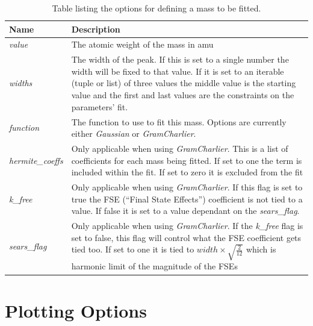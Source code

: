 \documentclass[paper=a4, fontsize=11pt]{scrartcl}	%
\numberwithin{equation}{section}															%
\numberwithin{figure}{section}																%
\numberwithin{table}{section}
\begin{document}
\begin{appendices}
\begin{table}[H]
\centering
\begin{tabular}{ l p{12cm}}
Name & Description \\ \hline
\textit{value} & The atomic weight of the mass in amu \\ \hline
\textit{widths} & The width of the peak. If this is set to a single number the width will be fixed to that value. If it is set to an iterable (tuple or list) of three values the middle value is the starting value and the first and last values are the constraints on the parameters' fit. \\ \hline
\textit{function} & The function to use to fit this mass. Options are currently either \textit{Gaussian} or \textit{GramCharlier}. \\ \hline
\textit{hermite\_coeffs} & Only applicable when using \textit{GramCharlier}. This is a list of coefficients for each mass being fitted. If set to one the term is included within the fit. If set to zero it is excluded from the fit\\ \hline
\textit{k\_free} & Only applicable when using \textit{GramCharlier}. If this flag is set to true the FSE (``Final State Effects'') coefficient is not tied to a value. If false it is set to a value dependant on the \textit{sears\_flag}.\\ \hline
\textit{sears\_flag} & Only applicable when using \textit{GramCharlier}. If the \textit{k\_free} flag is set to false, this flag will control what the FSE coefficient gets tied too. If set to one it is tied to $width\times\sqrt{\frac{2}{12}}$ which is harmonic limit of the magnitude of the FSEs\\ \hline
\end{tabular}
\caption{Table listing the options for defining a mass to be fitted.}
\label{table:mass-parameters}
\end{table}

\clearpage
\section{Plotting Options}
\label{sec:plotting-options}


\end{appendices}
\end{document}
